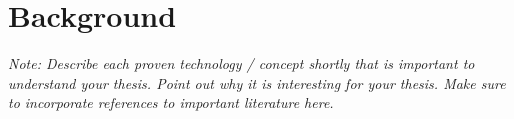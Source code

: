 \chapter{Background}

\textit{Note: Describe each proven technology / concept shortly that is important to understand your thesis. Point out why it is interesting for your thesis. Make sure to incorporate references to important literature here.}
